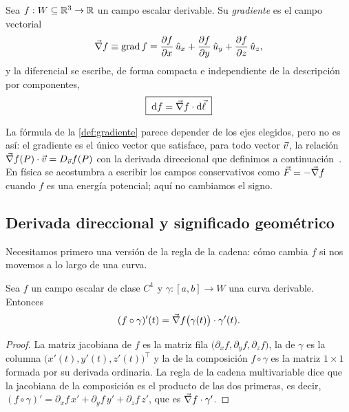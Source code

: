\begin{definicion}[Gradiente]\label{def:gradiente}
Sea $f:W\subseteq\mathbb{R}^{3}\to\mathbb{R}$ un campo escalar derivable. Su \emph{gradiente}
es el campo vectorial
\[
  \vec{\nabla} f\equiv\operatorname{grad} f=\frac{\partial f}{\partial x}\,\hat{u}_{x}+\frac{\partial f}{\partial y}\,\hat{u}_{y}+\frac{\partial f}{\partial z}\,\hat{u}_{z},
\]
y la diferencial se escribe, de forma compacta e independiente de la
descripción por componentes,
\begin{equation}\label{eq:df-compacta}
  \boxed{\;\mathrm{d} f=\vec{\nabla} f\cdot\mathrm{d}\vec{\ell}\;}
\end{equation}
\end{definicion}

\begin{observacion}\label{obs:grad-intrinseco}
La fórmula de la \cref{def:gradiente} parece depender de los ejes elegidos, pero
no es así: el gradiente es el único vector que satisface, para todo vector
$\vec{v}$, la relación $\vec{\nabla} f(P)\cdot\vec{v}=D_{\vec{v}}f(P)$ con la derivada
direccional que definimos a continuación~\cite{NAVAS}. En
física se acostumbra a escribir los campos conservativos como $\vec{F}=-\vec{\nabla} f$
cuando $f$ es una energía potencial; aquí no cambiamos el signo.
\end{observacion}

\subsection{Derivada direccional y significado geométrico}\label{sec:direccional}
Necesitamos primero una versión de la regla de la cadena: cómo cambia $f$ si
nos movemos a lo largo de una curva.

\begin{proposicion}\label{prop:cadena}
Sea $f$ un campo escalar de clase $C^{1}$ y $\gamma:[a,b]\to W$ una curva
derivable. Entonces
\begin{equation}\label{eq:cadena}
  (f\circ\gamma)'(t)=\vec{\nabla} f\bigl(\gamma(t)\bigr)\cdot\gamma'(t).
\end{equation}
\end{proposicion}
\begin{proof}
La matriz jacobiana de $f$ es la matriz fila $\bigl(\partial_xf,\partial_yf,\partial_zf\bigr)$,
la de $\gamma$ es la columna $\bigl(x'(t),y'(t),z'(t)\bigr)^{\!\top}$ y la de la
composición $f\circ\gamma$ es la matriz $1\times1$ formada por su derivada
ordinaria. La regla de la cadena multivariable dice que la jacobiana de la
composición es el producto de las dos primeras, es decir,
$(f\circ\gamma)'=\partial_xf\,x'+\partial_yf\,y'+\partial_zf\,z'$, que es
$\vec{\nabla} f\cdot\gamma'$.
\end{proof}

